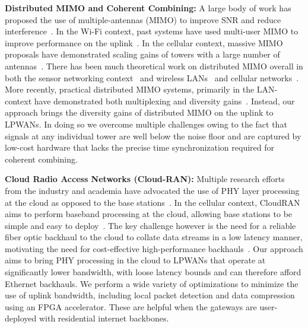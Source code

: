 \noindent \textbf{Distributed MIMO and Coherent Combining: } A large body of
work has proposed the use of multiple-antennas (MIMO) to improve SNR and
reduce interference~\cite{xie2014scalable, lin2011random, kumar2013bringing}.
In the Wi-Fi context, past systems have used multi-user MIMO to improve
performance on the uplink~\cite{shen2014rate, tan2009sam, xie2014scalable}. In
the cellular context, massive MIMO proposals have demonstrated scaling gains
of towers with a large number of antennas~\cite{shepard2012argos,
larsson2014massive}. There has been much theoretical work on distributed MIMO
overall in both the sensor networking context~\cite{del2007cooperative} and
wireless LANs~\cite{dohler2004resource} and cellular
networks~\cite{sawahashi2010coordinated}.  More recently, practical
distributed MIMO systems, primarily in the LAN-context have demonstrated both
multiplexing and diversity gains~\cite{hamed2016real, yenamandra2014vidyut,
rahul2012jmb}. Instead, our approach brings the diversity gains of distributed
MIMO on the uplink to LPWANs. In doing so we overcome multiple challenges
owing to the fact that signals at any individual tower are well below the
noise floor and are captured by low-cost hardware that lacks the precise time
synchronization required for coherent combining.

\noindent \textbf{Cloud Radio Access Networks (Cloud-RAN): } Multiple research
efforts from the industry and academia have advocated the use of PHY layer
processing at the cloud as opposed to the base stations~\cite{sabella2013ran,
hadzialic2013cloud}. In the cellular context, CloudRAN aims to perform
baseband processing at the cloud, allowing base stations to be simple and easy
to deploy~\cite{checko2015cloud, wubben2014benefits}. The key challenge
however is the need for a reliable fiber optic backhaul to the cloud to
collate data streams in a low latency manner, motivating the need for
cost-effective high-performance backhauls~\cite{liu2013case, chih2014recent}.
Our approach aims to bring PHY processing in the cloud to LPWANs that operate
at significantly lower bandwidth, with loose latency bounds and can therefore
afford Ethernet backhauls. We perform a wide variety of optimizations to
minimize the use of uplink bandwidth, including local packet detection and
data compression using an FPGA accelerator. These are helpful when the
gateways are user-deployed with residential internet backbones.